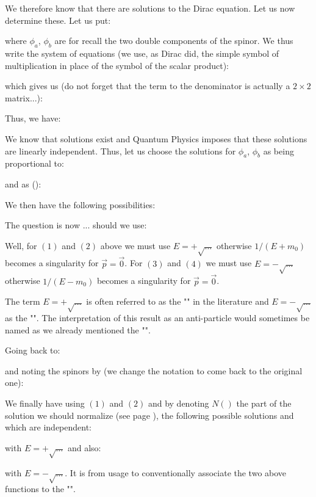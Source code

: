 We therefore know that there are solutions to the Dirac equation. Let us now determine these. Let us put:
	
	where $\phi_a$, $\phi_b$ are for recall the two double components of the spinor. We thus write the system of equations (we use, as Dirac did, the simple symbol of multiplication in place of the symbol of the scalar product):
	
	which gives us (do not forget that the term to the denominator is actually a $2\times 2$ matrix...):
	
	Thus, we have:
	
	We know that solutions exist and Quantum Physics imposes that these solutions are linearly independent. Thus, let us choose the solutions for $\phi_a$, $\phi_b$ as being proportional to:
	
	and as ():
	
	We then have the following possibilities:
	
	The question is now ... should we use:
 	
	Well, for $(1)$ and $(2)$ above we must use $E=+\sqrt{\ldots}$ otherwise $1/(E+m_0)$ becomes a singularity for $\vec{p}=\vec{0}$. For $(3)$ and $(4)$ we must use $E=-\sqrt{\ldots}$ otherwise $1/(E-m_0)$ becomes a singularity for $\vec{p}=\vec{0}$.
	\begin{tcolorbox}[title=Remark,colframe=black,arc=10pt]
	The term $E=+\sqrt{\ldots}$ is often referred to as the "" in the literature and $E=-\sqrt{\ldots}$ as the "". The interpretation of this result as an anti-particle would sometimes be named as we already mentioned the "".
	\end{tcolorbox}
	Going back to:
	
	and noting the spinors by (we change the notation to come back to the original one):
	
	\label{free particle dirac equation involving factor N} We finally have using $(1)$ and $(2)$ and by denoting $N()$ the part of the solution we should normalize (see page \pageref{normalization dirac free particle solution}), the following possible solutions and which are independent:
	
	
	with $E=+\sqrt{\ldots}$ and also:
	
	
	with $E=-\sqrt{\ldots}$. It is from usage to conventionally associate the two above functions to the "".

